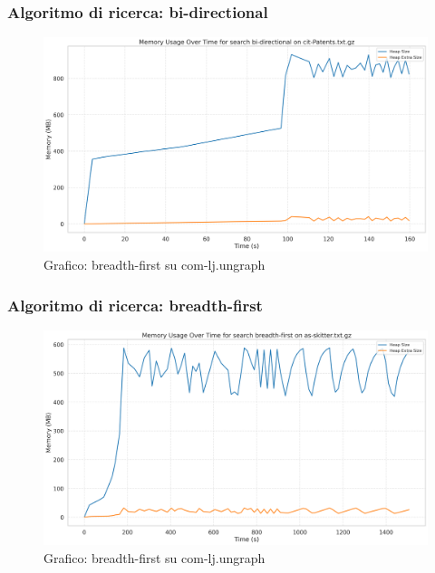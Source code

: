 \documentclass{article}
\begin{document}
\subsubsection{Algoritmo di ricerca: bi-directional}
\begin{figure}[h]\centering
\includegraphics[width=\textwidth]{../plots/cit-Patents_bi-directional.png}
\caption{Grafico: breadth-first su com-lj.ungraph}
\end{figure}
\subsubsection{Algoritmo di ricerca: breadth-first}
\begin{figure}[h]\centering
\includegraphics[width=\textwidth]{../plots/as-skitter_breadth-first.png}
\caption{Grafico: breadth-first su com-lj.ungraph}
\end{figure}
\end{document}
